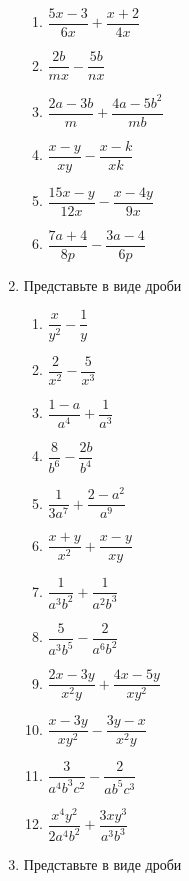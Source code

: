 \documentclass[10pt, a4paper]{article}
\begin{document}
\begin{enumerate}
\begin{multicols}{3}
		\begin{enumerate}
			\item $\dfrac{5x-3}{6x}+\dfrac{x+2}{4x}$ 
			\item $\dfrac{2b}{mx}-\dfrac{5b}{nx}$ 
			\item $\dfrac{2a-3b}{m}+\dfrac{4a-5b^2}{mb}$ 
			\item $\dfrac{x-y}{xy}-\dfrac{x-k}{xk}$ 
			\item $\dfrac{15x-y}{12x}-\dfrac{x-4y}{9x}$ 
			\item $\dfrac{7a+4}{8p}-\dfrac{3a-4}{6p}$ 
		\end{enumerate}
	\end{multicols}
	\item Представьте в виде дроби
	\begin{multicols}{3}
		\begin{enumerate}
			\item $\dfrac{x}{y^2}-\dfrac{1}{y}$ 
			\item $\dfrac{2}{x^2}-\dfrac{5}{x^3}$ 
			\item $\dfrac{1-a}{a^4}+\dfrac{1}{a^3}$ 
			\item $\dfrac{8}{b^6}-\dfrac{2b}{b^4}$ 
			\item $\dfrac{1}{3a^7}+\dfrac{2-a^2}{a^9}$ 
			\item $\dfrac{x+y}{x^2}+\dfrac{x-y}{xy}$ 
			\item $\dfrac{1}{a^3b^2}+\dfrac{1}{a^2b^3}$ 
			\item $\dfrac{5}{a^3b^5}-\dfrac{2}{a^6b^2}$ 
			\item $\dfrac{2x-3y}{x^2y}+\dfrac{4x-5y}{xy^2}$ 
			\item $\dfrac{x-3y}{xy^2}-\dfrac{3y-x}{x^2y}$ 
			\item $\dfrac{3}{a^4b^3c^2}-\dfrac{2}{ab^5c^3}$ 
			\item $\dfrac{x^4y^2}{2a^4b^2}+\dfrac{3xy^3}{a^3b^3}$ 
		\end{enumerate}
	\end{multicols}
	\item Представьте в виде дроби
	\begin{multicols}{4}

\end{multicols}
\end{enumerate}
\end{document}
